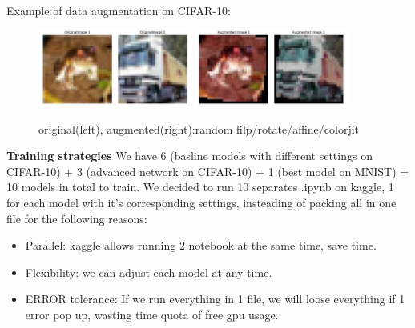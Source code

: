 \documentclass{article}
\begin{document}
\noindent Example of data augmentation on CIFAR-10:

\begin{figure}[H]
  \centering
  \includegraphics[width=0.45\textwidth]{fig/original.png} %
  \includegraphics[width=0.45\textwidth]{fig/augmented.png} %
  \caption{original(left), augmented(right):random filp/rotate/affine/colorjit } %
  \label{fig:original} %
\end{figure}

\noindent\textbf{Training strategies}
We have 6 (basline models with different settings on CIFAR-10) + 3 (advanced network on CIFAR-10) + 1 (best model on MNIST) = 10 models in total to train. We decided to run 10 separates .ipynb on kaggle, 1 for each model with it's corresponding settings, insteading of packing all in one file for the following reasons:

\begin{itemize}
  \item Parallel: kaggle allows running 2 notebook at the same time, save time.
  \item Flexibility: we can adjust each model at any time.
  \item ERROR tolerance: If we run everything in 1 file, we will loose everything if 1 error pop up, wasting time quota of free gpu usage.
\end{itemize}
\end{document}
